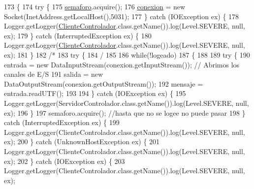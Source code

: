 \begin{DoxyCode}
173         \{
174             \textcolor{keywordflow}{try} \{
175             \mbox{\hyperlink{classpecl6part2_1_1_cliente_controlador_a200ce4defcaa86a68e9c8234f9e48a81}{semaforo}}.acquire();
176                 \mbox{\hyperlink{classpecl6part2_1_1_cliente_controlador_a4882463501ccc3555c15225ea3076745}{conexion}} = \textcolor{keyword}{new} Socket(InetAddress.getLocalHost(),5031);
177             \} \textcolor{keywordflow}{catch} (IOException ex) \{
178                 Logger.getLogger(\mbox{\hyperlink{classpecl6part2_1_1_cliente_controlador_a6e526681bd2137858bfb2940eeb23cc8}{ClienteControlador}}.class.getName()).log(Level.SEVERE, 
      null, ex);
179             \} \textcolor{keywordflow}{catch} (InterruptedException ex) \{
180                 Logger.getLogger(\mbox{\hyperlink{classpecl6part2_1_1_cliente_controlador_a6e526681bd2137858bfb2940eeb23cc8}{ClienteControlador}}.class.getName()).log(Level.SEVERE, 
      null, ex);
181             \}
182             \textcolor{comment}{/*}
183 \textcolor{comment}{            try \{}
184 \textcolor{comment}{                /}
185 \textcolor{comment}{                }
186 \textcolor{comment}{                while(!logeado)}
187 \textcolor{comment}{                \{}
188 \textcolor{comment}{                }
189 \textcolor{comment}{                try \{}
190 \textcolor{comment}{                entrada = new DataInputStream(conexion.getInputStream());  // Abrimos los canales de E/S}
191 \textcolor{comment}{                salida  = new DataOutputStream(conexion.getOutputStream());}
192 \textcolor{comment}{                mensaje = entrada.readUTF();}
193 \textcolor{comment}{                }
194 \textcolor{comment}{                \} catch (IOException ex) \{}
195 \textcolor{comment}{                Logger.getLogger(ServidorControlador.class.getName()).log(Level.SEVERE, null, ex);}
196 \textcolor{comment}{                \}}
197 \textcolor{comment}{                semaforo.acquire(); //hasta que no se logee no puede pasar}
198 \textcolor{comment}{            \} catch (InterruptedException ex) \{}
199 \textcolor{comment}{                Logger.getLogger(ClienteControlador.class.getName()).log(Level.SEVERE, null, ex);}
200 \textcolor{comment}{            \} catch (UnknownHostException ex) \{}
201 \textcolor{comment}{                Logger.getLogger(ClienteControlador.class.getName()).log(Level.SEVERE, null, ex);}
202 \textcolor{comment}{            \} catch (IOException ex) \{}
203 \textcolor{comment}{                Logger.getLogger(ClienteControlador.class.getName()).log(Level.SEVERE, null, ex);}

\end{DoxyCode}
